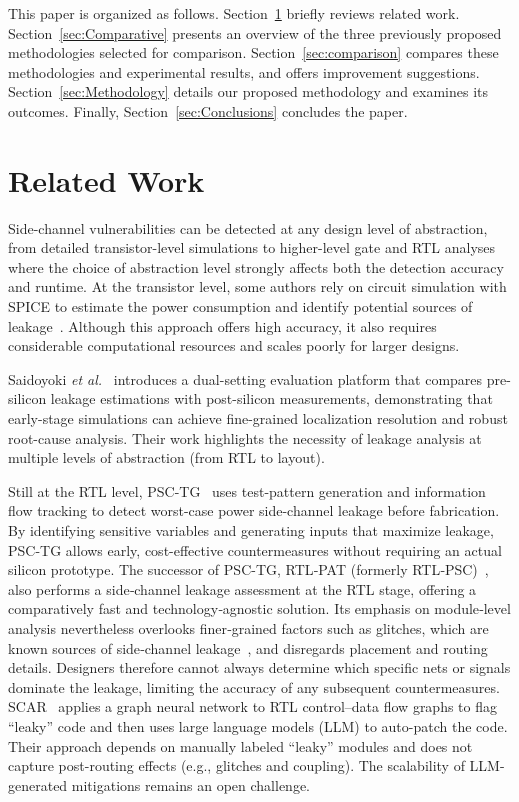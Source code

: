 \documentclass[sigconf]{acmart}
\begin{document}
{This paper is organized as follows. Section~\ref{sec:related} briefly reviews related work. Section~\ref{sec:Comparative} presents an overview of the three previously proposed methodologies selected for comparison. Section~\ref{sec:comparison} compares these methodologies and experimental results, and offers improvement suggestions. Section~\ref{sec:Methodology} details our proposed methodology and examines its outcomes. Finally, Section~\ref{sec:Conclusions} concludes the paper.

}

\section{Related Work}
\label{sec:related}


Side-channel vulnerabilities can be detected at any design level of abstraction, from detailed transistor-level simulations to higher-level gate and RTL analyses where the choice of abstraction level strongly affects both the detection accuracy and runtime. At the transistor level, some authors rely on circuit simulation with SPICE to estimate the power consumption and identify potential sources of leakage~\cite{SpiceLV}. Although this approach offers high accuracy, it also requires considerable computational resources and scales poorly for larger designs.




 
Saidoyoki \emph{et al.}~\cite{Saidoyoki} introduces a dual-setting evaluation platform that compares pre-silicon leakage estimations with post-silicon measurements, demonstrating that early-stage simulations can achieve fine-grained localization resolution and robust root-cause analysis. Their work highlights the necessity of leakage analysis at multiple levels of abstraction (from RTL to layout).




Still at the RTL level, PSC-TG~\cite{PSC-TG} uses test-pattern generation and information flow tracking to detect worst-case power side-channel leakage before fabrication. By identifying sensitive variables and generating inputs that maximize leakage, PSC-TG allows early, cost-effective countermeasures without requiring an actual silicon prototype. The successor of PSC-TG, RTL‑PAT (formerly RTL‑PSC)~\cite{RTL_PSC}, also performs a side‑channel leakage assessment at the RTL stage, offering a comparatively fast and technology‑agnostic solution. Its emphasis on module‑level analysis nevertheless overlooks finer‑grained factors such as glitches, which are known sources of side‑channel leakage~\cite{glitches}, and disregards placement and routing details. Designers therefore cannot always determine which specific nets or signals dominate the leakage, limiting the accuracy of any subsequent countermeasures.
SCAR~\cite{scar} applies a graph neural network to RTL control–data flow graphs to flag ``leaky'' code and then uses large language models (LLM) to auto-patch the code. Their approach depends on manually labeled ``leaky'' modules and does not capture post-routing effects (e.g., glitches and coupling). The scalability %
of LLM-generated mitigations remains an open challenge.
\end{document}

